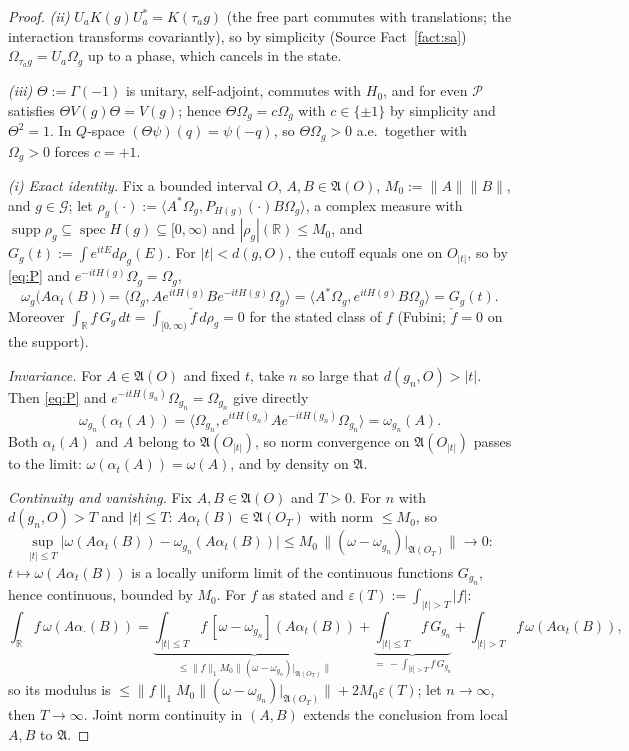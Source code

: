 \documentclass[11pt,a4paper]{article}
\theoremstyle{plain}
\theoremstyle{definition}
\newcommand{\R}{\mathbb{R}}
\newcommand{\A}{\mathfrak{A}}
\newcommand{\G}{\mathcal{G}}
\newcommand{\Om}{\Omega}
\newcommand{\ip}[2]{\langle #1,#2\rangle}
\DeclareMathOperator{\supp}{supp}
\DeclareMathOperator{\spec}{spec}
\begin{document}
\begin{proof}
\emph{(ii)} $U_aK(g)U_a^*=K(\tau_ag)$ (the free part commutes with translations; the
interaction transforms covariantly), so by simplicity (Source Fact~\ref{fact:sa})
$\Om_{\tau_ag}=U_a\Om_g$ up to a phase, which cancels in the state.

\emph{(iii)} $\Theta:=\Gamma(-1)$ is unitary, self-adjoint, commutes with $H_0$, and for even
$\mathscr P$ satisfies $\Theta V(g)\Theta=V(g)$; hence $\Theta\Om_g=c\Om_g$ with $c\in\{\pm1\}$
by simplicity and $\Theta^2=1$. In $Q$-space $(\Theta\psi)(q)=\psi(-q)$, so $\Theta\Om_g>0$
a.e.\ together with $\Om_g>0$ forces $c=+1$.

\emph{(i)} \emph{Exact identity.} Fix a bounded interval $O$, $A,B\in\A(O)$,
$M_0:=\|A\|\|B\|$, and $g\in\G$; let
$\rho_g(\cdot):=\ip{A^*\Om_g}{P_{H(g)}(\cdot)B\Om_g}$, a complex measure with
$\supp\rho_g\subseteq\spec H(g)\subseteq[0,\infty)$ and $|\rho_g|(\R)\le M_0$, and
$G_g(t):=\int e^{itE}d\rho_g(E)$. For $|t|<d(g,O)$, the cutoff equals one on $O_{|t|}$, so by
\eqref{eq:P} and $e^{-itH(g)}\Om_g=\Om_g$,
\[
  \omega_g\bigl(A\alpha_t(B)\bigr)
  =\ip{\Om_g}{Ae^{itH(g)}Be^{-itH(g)}\Om_g}
  =\ip{A^*\Om_g}{e^{itH(g)}B\Om_g}=G_g(t) .
\]
Moreover $\int_\R f\,G_g\,dt=\int_{[0,\infty)}\check f\,d\rho_g=0$ for the stated class of $f$
(Fubini; $\check f=0$ on the support).

\emph{Invariance.} For $A\in\A(O)$ and fixed $t$, take $n$ so large that
$d(g_n,O)>|t|$. Then \eqref{eq:P} and $e^{-itH(g_n)}\Om_{g_n}=\Om_{g_n}$ give directly
\[
 \omega_{g_n}(\alpha_t(A))
 =\ip{\Om_{g_n}}{e^{itH(g_n)}Ae^{-itH(g_n)}\Om_{g_n}}
 =\omega_{g_n}(A).
\]
Both $\alpha_t(A)$ and $A$ belong to $\A(O_{|t|})$, so norm convergence on
$\A(O_{|t|})$ passes to the limit:
$\omega(\alpha_t(A))=\omega(A)$, and by density on $\A$.

\emph{Continuity and vanishing.} Fix $A,B\in\A(O)$ and $T>0$. For $n$ with $d(g_n,O)>T$ and
$|t|\le T$: $A\alpha_t(B)\in\A(O_T)$ with norm $\le M_0$, so
\[
  \sup_{|t|\le T}\bigl|\omega(A\alpha_t(B))-\omega_{g_n}(A\alpha_t(B))\bigr|
  \le M_0\,\bigl\|(\omega-\omega_{g_n})|_{\A(O_T)}\bigr\|\longrightarrow0 :
\]
$t\mapsto\omega(A\alpha_t(B))$ is a locally uniform limit of the continuous functions $G_{g_n}$,
hence continuous, bounded by $M_0$. For $f$ as stated and
$\varepsilon(T):=\int_{|t|>T}|f|$:
\[
  \int_\R f\,\omega(A\alpha_\cdot(B))
  =\underbrace{\int_{|t|\le T}f\,[\omega-\omega_{g_n}](A\alpha_t(B))}_{\le\|f\|_1M_0
  \|(\omega-\omega_{g_n})|_{\A(O_T)}\|}
  +\underbrace{\int_{|t|\le T}f\,G_{g_n}}_{=\,-\int_{|t|>T}f\,G_{g_n}}
  +\int_{|t|>T}f\,\omega(A\alpha_t(B)) ,
\]
so its modulus is $\le\|f\|_1M_0\|(\omega-\omega_{g_n})|_{\A(O_T)}\|+2M_0\varepsilon(T)$;
let $n\to\infty$, then $T\to\infty$. Joint norm continuity in $(A,B)$ extends the conclusion
from local $A,B$ to $\A$.
\end{proof}
\end{document}
